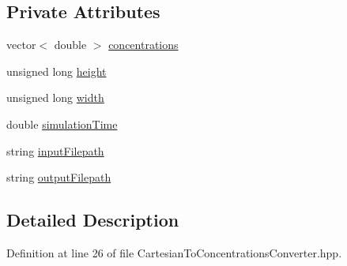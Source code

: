 \subsection*{Private Attributes}
\begin{DoxyCompactItemize}
\item 
vector$<$ double $>$ \hyperlink{classmultiscale_1_1video_1_1CartesianToConcentrationsConverter_a335f54163cbabeaa80c1da811b9f9c0c}{concentrations}
\item 
unsigned long \hyperlink{classmultiscale_1_1video_1_1CartesianToConcentrationsConverter_a94e58072f2e143bd6476133370ffb37f}{height}
\item 
unsigned long \hyperlink{classmultiscale_1_1video_1_1CartesianToConcentrationsConverter_ae6fba5af405d884c7b70ed206a6d5cb1}{width}
\item 
double \hyperlink{classmultiscale_1_1video_1_1CartesianToConcentrationsConverter_a6e66af60b82513b3186fdb32cad44597}{simulation\-Time}
\item 
string \hyperlink{classmultiscale_1_1video_1_1CartesianToConcentrationsConverter_affebbc7e1c67692bd529f19fc0451e58}{input\-Filepath}
\item 
string \hyperlink{classmultiscale_1_1video_1_1CartesianToConcentrationsConverter_a9215448e33876a581b206a89b6651fd0}{output\-Filepath}
\end{DoxyCompactItemize}


\subsection{Detailed Description}


Definition at line 26 of file Cartesian\-To\-Concentrations\-Converter.\-hpp.



